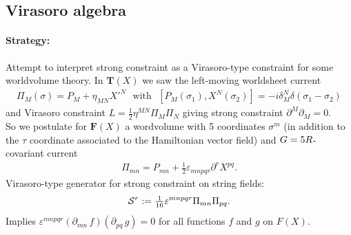 \documentclass[12pt]{article} %
\numberwithin{equation}{section}
\def\S{{\cal S}}
\begin{document}
\subsection{Virasoro algebra}
\paragraph{
	Strategy:
} 
Attempt to interpret strong constraint as a Virasoro-type constraint for some worldvolume theory.
In $\mathbf T(X)$ we saw the left-moving worldsheet current 
\begin{align*}
\Pi_M(\sigma) = P_M + \eta_{MN}X'^N
~~~\mathrm{with}~~~
[P_M(\sigma_1), X^N(\sigma_2)] = -i \delta_M^N \delta(\sigma_1-\sigma_2) 
\end{align*}
and Virasoro constraint $L =\tfrac12 \eta^{MN}\Pi_M\Pi_N$ giving strong constraint $\partial^M\partial_M=0$.\\
So we postulate for $\mathbf F(X)$ a wordvolume with 5 coordinates $\sigma^m$ (in addition to the $\tau$ coordinate associated to the Hamiltonian vector field) and $G = \sl5R$- covariant current
\begin{align*}
\Pi_{mn} = P_{mn} + \tfrac12 \varepsilon_{mnpqr} \partial^r X^{pq}.
\end{align*}
Virasoro-type generator for strong constraint on string fields:
\begin{align*}
\S^r := \tfrac1{16} \varepsilon^{mnpqr} \Pi_{mn}\Pi_{pq}  .
\end{align*}
Implies $\varepsilon^{mnpqr}(\partial_{mn}\, f)(\partial_{pq}\, g) = 0$ for all functions $f$ and $g$ on $F(X)$.
\end{document}
